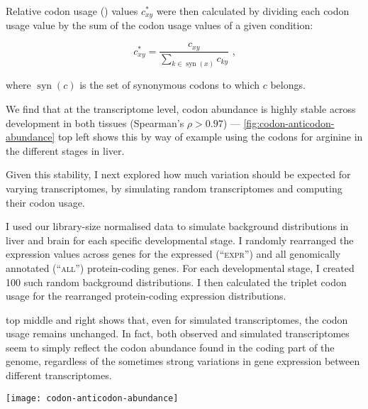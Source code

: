Relative codon usage (\rcu) values \(c_{xy}^*\) were then calculated by dividing
each codon usage value by the sum of the codon usage values of a given
condition:

\begin{equation}
    c_{xy}^* = \frac{c_{xy}}{\sum_{k\in \operatorname{syn}(x)} c_{ky}} \text{\ ,}
\end{equation}

where \(\operatorname{syn}(c)\) is the set of synonymous codons to which \(c\)
belongs.

We find that at the transcriptome level, codon abundance is highly stable across
development in both tissues (Spearman’s \(\rho > 0.97\)) ---
\cref{fig:codon-anticodon-abundance} top left shows this by way of example using
the codons for arginine in the different stages in liver.

Given this stability, I next explored how much variation should be expected for
varying transcriptomes, by simulating random transcriptomes and computing their
codon usage.

I used our library-size normalised \rnaseq data to simulate background
distributions in liver and brain for each specific developmental stage. I
randomly rearranged the expression values across genes for the expressed
(“\textsc{expr}”) and all genomically annotated (“\textsc{all}”) protein-coding
genes. For each developmental stage, I created \num{100} such random background
distributions. I then calculated the triplet codon usage for the rearranged
protein-coding \rna expression distributions.

 top middle and right shows that, even for
simulated transcriptomes, the codon usage remains unchanged. In fact, both
observed and simulated transcriptomes seem to simply reflect the codon abundance
found in the coding part of the genome, regardless of the sometimes strong
variations in gene expression between different transcriptomes.

    {\texttt{[image: codon-anticodon-abundance]}}{}

